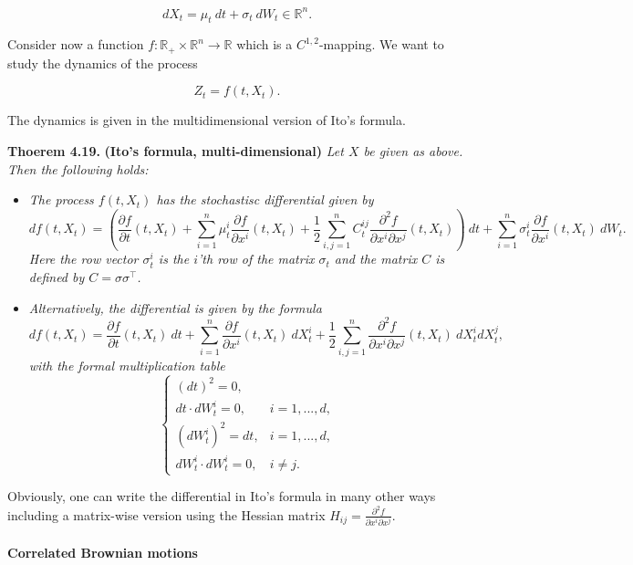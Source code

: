\documentclass[
]{article}
\providecommand{\tightlist}{%
  \setlength{\itemsep}{0pt}\setlength{\parskip}{0pt}}
\begin{document}
\[
d X_t=\mu_t\ dt+\sigma_t\ dW_t\in\mathbb{R}^n.
\]

Consider now a function
\(f:\mathbb{R}_+\times \mathbb{R}^n\to\mathbb{R}\) which is a
\(C^{1,2}\)-mapping. We want to study the dynamics of the process

\[
Z_t=f(t,X_t).
\]

The dynamics is given in the multidimensional version of Ito's formula.

\textbf{Thoerem 4.19.} \textbf{(Ito's formula, multi-dimensional)}
\emph{Let \(X\) be given as above. Then the following holds:}

\begin{itemize}
\tightlist
\item
  \emph{The process \(f(t,X_t)\) has the stochastisc differential given
  by} \[
    df(t,X_t)=\left(\frac{\partial f}{\partial t}(t,X_t) + \sum_{i=1}^n\mu^i_t\frac{\partial f}{\partial x^i}(t,X_t) + \frac{1}{2}\sum_{i,j=1}^nC_t^{ij}\frac{\partial^2 f}{\partial x^i\partial x^j}(t,X_t)\right)\ dt+\sum_{i=1}^n\sigma^i_t\frac{\partial f}{\partial x^i}(t,X_t)\ dW_t.
    \] \emph{Here the row vector \(\sigma^i_t\) is the \(i\)'th row of
  the matrix \(\sigma_t\) and the matrix \(C\) is defined by
  \(C=\sigma\sigma^\top\).}
\item
  \emph{Alternatively, the differential is given by the formula} \[
    df(t,X_t)=\frac{\partial f}{\partial t}(t,X_t)\ dt + \sum_{i=1}^n\frac{\partial f}{\partial x^i}(t,X_t)\ dX^i_t + \frac{1}{2}\sum_{i,j=1}^n\frac{\partial^2 f}{\partial x^i\partial x^j}(t,X_t)\ dX^i_tdX^j_t,
    \] \emph{with the formal multiplication table} \[
    \left\{\begin{matrix}(dt)^2=0,\\  dt\cdot dW_t^i=0, & i = 1,...,d,\\ (dW_t^i)^2=dt, & i=1,...,d, \\ dW_t^i\cdot dW_t^i =0, & i\ne j.\end{matrix}\right.
    \]
\end{itemize}

Obviously, one can write the differential in Ito's formula in many other
ways including a matrix-wise version using the Hessian matrix
\(H_{ij}=\frac{\partial^2 f}{\partial x^i\partial x^j}\).

\hypertarget{correlated-brownian-motions}{%
\paragraph{Correlated Brownian
motions}\label{correlated-brownian-motions}}
\end{document}
